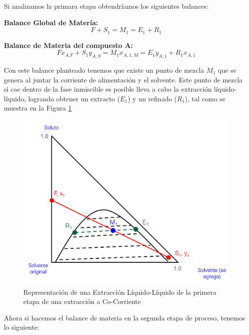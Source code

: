 \documentclass[11pt]{book}
\begin{document}
Si analizamos la primara etapa obtendríamos los siguientes balances: 

\textbf{Balance Global de Matería:}
\begin{equation}
    \label{eq:ExtraccionLiqLiqCocorriente_1}
    F + S_1 = M_1 = E_1 + R_1
\end{equation}

\textbf{Balance de Materia del compuesto A:}
\begin{equation}
    \label{eq:ExtraccionLiqLiqCocorriente_2}
    F x_{A.F} + S_1 y_{A,S} = M_1 x_{A,1,M} = E_1 y_{A,1} + R_1 x_{A,1}
\end{equation}

Con este balance planteado tenemos que existe un punto de mezcla $M_1$ que se genera al juntar la corriente de alimentación y el solvente. Este punto de mezcla si cae dentro de la fase inmiscible es posible lleva a cabo la extracción líquido-líquido, logrando obtener un extracto ($E_1$) y un refinado ($R_1$), tal como se muestra en la Figura \ref{fig:ExtraccionLiqLiqCocorriente_2}

\begin{figure}[H]
    \centering
    \includegraphics{img/LiquidoLiquido/ExtracionLiqLiqCoCorriente_2.PNG}
    \caption{Representación de una Extracción Líquido-Líquido de la primera etapa de una extracción a Co-Corriente}
    \label{fig:ExtraccionLiqLiqCocorriente_2}
\end{figure}

Ahora si hacemos el balance de materia en la segunda etapa de proceso, tenemos lo siguiente:
\end{document}
